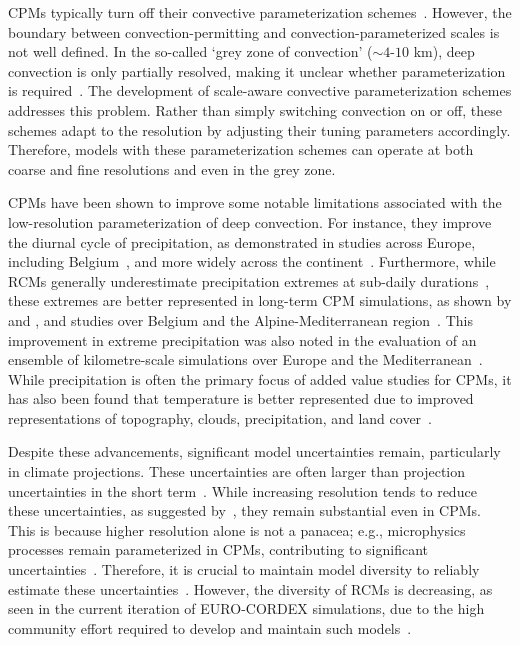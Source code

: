 \documentclass[journal abbreviation, manuscript]{copernicus}
\begin{document}
CPMs typically turn off their convective parameterization schemes~\citep{coppola_first--its-kind_2020}.
However, the boundary between convection-permitting and convection-parameterized scales is not well defined.
In the so-called `grey zone of convection' ($\sim 4$-$10$ km), deep convection is only partially resolved, making it unclear whether parameterization is required~\citep{vergara-temprado_climate_2020}.
The development of scale-aware convective parameterization schemes addresses this problem.
Rather than simply switching convection on or off, these schemes adapt to the resolution by adjusting their tuning parameters accordingly.
Therefore, models with these parameterization schemes can operate at both coarse and fine resolutions and even in the grey zone.

CPMs have been shown to improve some notable limitations associated with the low-resolution parameterization of deep convection. 
For instance, they improve the diurnal cycle of precipitation, as demonstrated in studies across Europe, including Belgium~\citep{de_troch_application_2016, brisson_how_2016}, and more widely across the continent~\citep{berthou_pan-european_2020}. 
Furthermore, while RCMs generally underestimate precipitation extremes at sub-daily durations~\citep{berg_summertime_2019}, these extremes are better represented in long-term CPM simulations, as shown by \citet{coppola_first--its-kind_2020} and \citet{fosser_convection-permitting_2024}, and studies over Belgium \citep{de_troch_multiscale_2013, tabari_local_2016, van_de_vyver_evaluation_2021} and the Alpine-Mediterranean region~\citep{muller_evaluation_2023, muller_climate_2024}. 
This improvement in extreme precipitation was also noted in the evaluation of an ensemble of kilometre-scale simulations over Europe and the Mediterranean~\citep{pichelli_first_2021, ban_first_2021, ha_precipitation_2024}. 
While precipitation is often the primary focus of added value studies for CPMs, it has also been found that temperature is better represented due to improved representations of topography, clouds, precipitation, and land cover~\citep{leutwyler_evaluation_2017, lucas-picher_convection-permitting_2021, soares_added_2022}.

Despite these advancements, significant model uncertainties remain, particularly in climate projections. 
These uncertainties are often larger than projection uncertainties in the short term~\citep{lehner_partitioning_2020}.
While increasing resolution tends to reduce these uncertainties, as suggested by~\citet{fosser_convection-permitting_2024}, they remain substantial even in CPMs. 
This is because higher resolution alone is not a panacea; e.g., microphysics processes remain parameterized in CPMs, contributing to significant uncertainties~\citep{prein_review_2015, lucas-picher_convection-permitting_2021}. 
Therefore, it is crucial to maintain model diversity to reliably estimate these uncertainties~\citep{IPCC_AR6_ch10}.
However, the diversity of RCMs is decreasing, as seen in the current iteration of EURO-CORDEX simulations, due to the high community effort required to develop and maintain such models~\citep{jacob_regional_2020, cordex_cmip6_downscaling_plans}.
\end{document}
